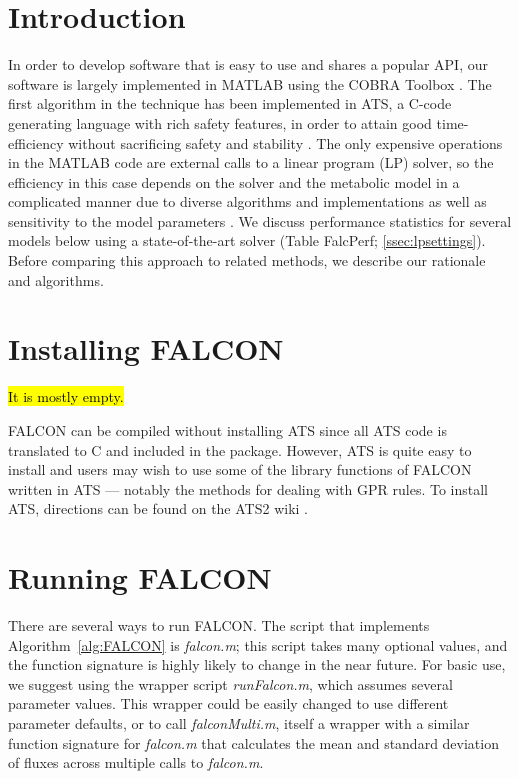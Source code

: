 \section{Introduction}

In order to develop software that is easy to use and shares a popular API,
our software is largely implemented in MATLAB using the COBRA
Toolbox \citep{Hyduke2011}. The first algorithm in the technique
has been implemented in ATS, a C-code generating language with rich
safety features, in order to attain good time-efficiency without sacrificing
safety and stability \citep{ATStypes03}. The only expensive operations in the
MATLAB code are external calls to a linear program (LP) solver,
so the efficiency in this case depends on the solver and the metabolic
model in a complicated manner due to diverse algorithms and
implementations as well as sensitivity to the model parameters
\citep{Mittelmann2013,Todd2002}. We discuss performance statistics for
several models below using a state-of-the-art solver (Table FalcPerf; 
\ref{ssec:lpsettings}). Before comparing this approach to related methods, we
describe our rationale and algorithms.

\section{Installing FALCON}

\hl {It is mostly empty.}

FALCON can be compiled without installing ATS since all ATS code is
translated to C and included in the package. However, ATS is quite
easy to install and users may wish to use some of the library
functions of FALCON written in ATS --- notably the methods for dealing
with GPR rules. To install ATS, directions can be found on the ATS2
wiki \citep{ATSWikiInstall}.

\section{Running FALCON}

There are several ways to run FALCON. The script that implements
Algorithm~\ref{alg:FALCON} is \textit{falcon.m}; this script takes
many optional values, and the function signature is highly likely
to change in the near future. For basic use, we suggest using
the wrapper script \textit{runFalcon.m}, which assumes several
parameter values. This wrapper could be easily changed to use
different parameter defaults, or to call \textit{falconMulti.m},
itself a wrapper with a similar function signature for
\textit{falcon.m} that calculates the mean and standard deviation of
fluxes across multiple calls to \textit{falcon.m}.

